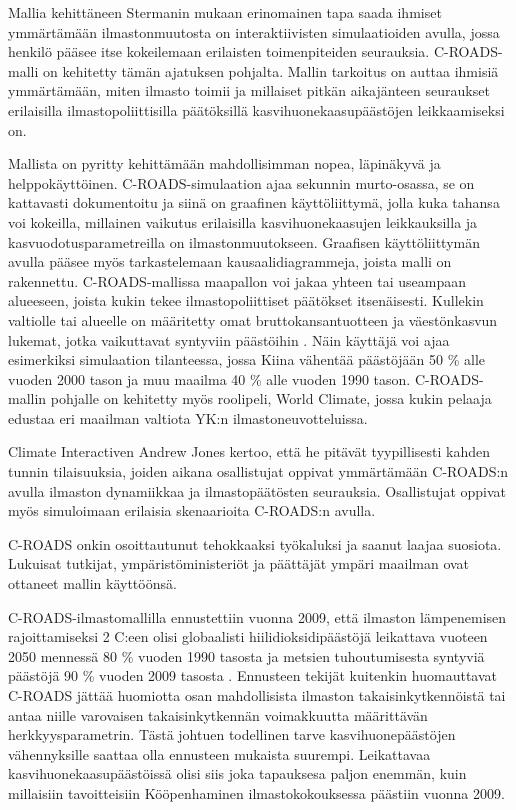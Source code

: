 \documentclass[finnish,12pt,a4paper,pdftex]{article}
\begin{document}
\begin{onehalfspacing}
Mallia kehittäneen Stermanin mukaan \cite{Sterman2011} erinomainen tapa saada ihmiset ymmärtämään ilmastonmuutosta on interaktiivisten simulaatioiden avulla, jossa henkilö pääsee itse kokeilemaan erilaisten toimenpiteiden seurauksia. C-ROADS-malli on kehitetty tämän ajatuksen pohjalta. Mallin tarkoitus on auttaa ihmisiä ymmärtämään, miten ilmasto toimii ja millaiset pitkän aikajänteen seuraukset erilaisilla ilmastopoliittisilla päätöksillä kasvihuonekaasupäästöjen leikkaamiseksi on. \cite{CroadsWWW, CroadsFlightSimulator2011}

Mallista on pyritty kehittämään mahdollisimman nopea, läpinäkyvä ja helppokäyttöinen. C-ROADS-simulaation ajaa sekunnin murto-osassa, se on kattavasti dokumentoitu ja siinä on graafinen käyttöliittymä, jolla kuka tahansa voi kokeilla, millainen vaikutus erilaisilla kasvihuonekaasujen leikkauksilla ja kasvuodotusparametreilla on ilmastonmuutokseen. Graafisen käyttöliittymän avulla pääsee myös tarkastelemaan kausaalidiagrammeja, joista malli on rakennettu. C-ROADS-mallissa maapallon voi jakaa yhteen tai useampaan alueeseen, joista kukin tekee ilmastopoliittiset päätökset itsenäisesti. \cite{Croads, CroadsWWW, CroadsFlightSimulator2011} Kullekin valtiolle tai alueelle on määritetty omat bruttokansantuotteen ja väestönkasvun lukemat, jotka vaikuttavat syntyviin päästöihin \cite{Fiddaman2012}. Näin käyttäjä voi ajaa esimerkiksi simulaation tilanteessa, jossa Kiina vähentää päästöjään 50 \% alle vuoden 2000 tason ja muu maailma 40 \% alle vuoden 1990 tason. C-ROADS-mallin pohjalle on kehitetty myös roolipeli, World Climate, jossa kukin pelaaja edustaa eri maailman valtiota YK:n ilmastoneuvotteluissa. \cite{CroadsWWW} 

Climate Interactiven Andrew Jones \cite{Jones2013} kertoo, että he pitävät tyypillisesti kahden tunnin tilaisuuksia, joiden aikana osallistujat oppivat ymmärtämään C-ROADS:n avulla ilmaston dynamiikkaa ja ilmastopäätösten seurauksia. Osallistujat oppivat myös simuloimaan erilaisia skenaarioita C-ROADS:n avulla. 

C-ROADS onkin osoittautunut tehokkaaksi työkaluksi ja saanut laajaa suosiota. Lukuisat tutkijat, ympäristöministeriöt ja päättäjät ympäri maailman ovat ottaneet mallin käyttöönsä. \cite{CroadsWWW, CroadsFlightSimulator2011, Jones2013} 

C-ROADS-ilmastomallilla ennustettiin vuonna 2009, että ilmaston lämpenemisen rajoittamiseksi 2 \degree C:een olisi globaalisti hiilidioksidipäästöjä leikattava vuoteen 2050 mennessä 80 \% vuoden 1990 tasosta ja metsien tuhoutumisesta syntyviä päästöjä 90 \%  vuoden 2009 tasosta \cite{Sawin2009, Sterman2011}. Ennusteen tekijät kuitenkin huomauttavat C-ROADS jättää huomiotta osan mahdollisista ilmaston takaisinkytkennöistä tai antaa niille varovaisen takaisinkytkennän voimakkuutta määrittävän herkkyysparametrin. Tästä johtuen todellinen tarve kasvihuonepäästöjen vähennyksille saattaa olla ennusteen mukaista suurempi. \cite{Sawin2009, Sterman2011} Leikattavaa kasvihuonekaasupäästöissä olisi siis joka tapauksesa paljon enemmän, kuin millaisiin tavoitteisiin Kööpenhaminen ilmastokokouksessa päästiin vuonna 2009. \cite{UNFCCCCopenhagen, Sawin2009} 


\end{onehalfspacing}
\end{document}
